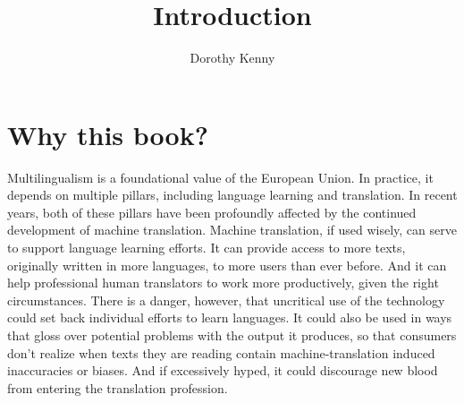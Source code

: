 \documentclass[output=paper]{langscibook}
\author{Dorothy Kenny\orcid{0000-0002-4793-9256}\affiliation{Dublin City University}}
\title{Introduction}
\begin{document}
\maketitle

\section{Why this book?}
Multilingualism is a foundational value of the European Union. In practice, it depends on multiple pillars, including language learning and translation. In recent years, both of these pillars have been profoundly affected by the continued development of machine translation. Machine translation, if used wisely, can serve to support language learning efforts. It can provide access to more texts, originally written in more languages, to more users than ever before. And it can help professional human translators to work more productively, given the right circumstances. There is a danger, however, that uncritical use of the technology could set back individual efforts to learn languages. It could also be used in ways that gloss over potential problems with the output it produces, so that consumers don't realize when texts they are reading contain machine-translation induced inaccuracies or biases. And if excessively hyped, it could discourage new blood from entering the translation profession. 
\end{document}

